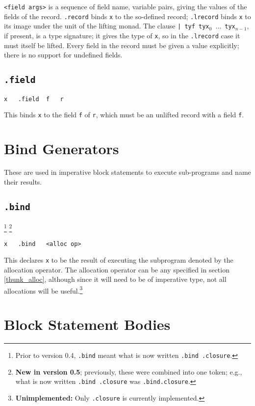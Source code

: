 \documentclass{report}
\newcommand\stringcode[1]{\texttt{#1}}
\newcommand\unimpl[1]{\footnote{\textbf{Unimplemented: }#1}}
\newcommand\old[2]{\footnote{Prior to version #1, #2}}
\newcommand\new[2]{\footnote{\textbf{New in version #1}; previously, #2}}
\begin{document}
\stringcode{<field args>} is a sequence of field name, variable pairs, giving the values of the fields of the record.
\stringcode{.record} binds \stringcode{x} to the so-defined record;
\stringcode{.lrecord} binds \stringcode{x} to its image under the unit of the lifting monad.
The clause \stringcode{| tyf tyx$_0$ $\ldots$ tyx$_{n-1}$}, if present, is a type signature;
it gives the type of \stringcode{x}, so in the \stringcode{.lrecord} case it must itself be lifted.
Every field in the record must be given a value explicitly; there is no support for undefined fields.

\subsection{\stringcode{.field}}

\begin{verbatim}
x	.field	f	r
\end{verbatim}

This binds \stringcode{x} to the field \stringcode{f} of \stringcode{r}, which must be an unlifted record with a field \stringcode{f}.

\section{Bind Generators}
\label{bind}

These are used in imperative block statements to execute sub-programs and name their results.

\subsection{\stringcode{.bind}}
\old{0.4}{\stringcode{.bind} meant what is now written \stringcode{.bind	.closure}.}
\new{0.5}{these were combined into one token; e.g., what is now written \stringcode{.bind	.closure} was \stringcode{.bind.closure}.}

\begin{verbatim}
x	.bind	<alloc op>
\end{verbatim}

This declares \stringcode{x} to be the result of executing the subprogram denoted by the allocation operator.
The allocation operator can be any specified in section \ref{thunk_alloc},
although since it will need to be of imperative type, not all allocations will be useful.\unimpl{Only \stringcode{.closure} is currently implemented.}

\section{Block Statement Bodies}
\label{body}
\end{document}
